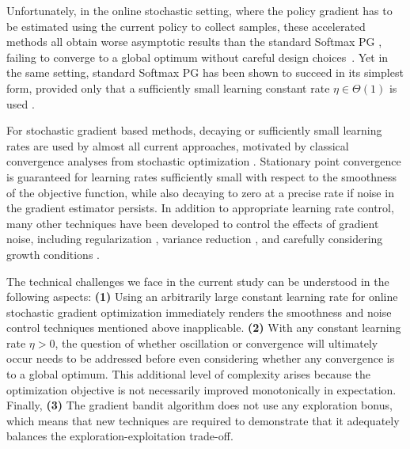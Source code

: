 Unfortunately, in the online stochastic setting, where the policy gradient has to be estimated using the current policy to collect samples, these accelerated methods all obtain worse asymptotic results than the standard Softmax PG \citep{mei2021understanding}, failing to converge to a global optimum without careful design choices~\citep{mei2022role}. Yet in the same setting, standard Softmax PG has been shown to succeed in its simplest form, provided only that a sufficiently small learning constant rate $\eta \in \Theta(1)$ is used \citep{mei2024stochastic}.

For stochastic gradient based methods, decaying or sufficiently small learning rates are used by almost all current approaches, motivated by classical convergence analyses from stochastic optimization %
\citep{robbins1951stochastic, ghadimi2013stochastic,zhang2020global,zhang2020sample,ding2021beyond,zhang2021convergence,yuan2022general,mei2024stochastic,denisov2020regret}. Stationary point convergence is guaranteed for learning rates sufficiently small with respect to the smoothness of the objective function, while also decaying to zero at a precise rate if noise in the gradient estimator persists. In addition to appropriate learning rate control, many other techniques have been developed to control the effects of gradient noise, including regularization \citep{zhang2020sample,ding2021beyond}, variance reduction \citep{zhang2021convergence}, and carefully considering growth conditions \citep{yuan2022general,mei2024stochastic}.

The technical challenges we face in the current study can be understood in the following aspects: \textbf{(1)} Using an arbitrarily large constant learning rate for online stochastic gradient optimization immediately renders the smoothness and noise control techniques mentioned above inapplicable.
\textbf{(2)} With any constant learning rate $\eta>0$, the question of whether oscillation or convergence will ultimately occur needs to be addressed before even considering whether any convergence is to a global optimum.  This additional level of complexity arises because the optimization objective is not necessarily improved monotonically in expectation. Finally, 
\textbf{(3)} The gradient bandit algorithm does not use any exploration bonus, which means that new techniques are required to demonstrate that it adequately balances the exploration-exploitation trade-off.

